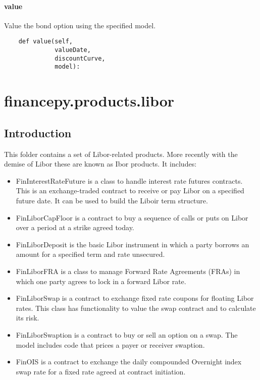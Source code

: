 \documentclass[twoside,11pt]{book}
\begin{document}
\subsubsection*{{\bf value}}
Value the bond option using the specified model.  

\begin{lstlisting}
    def value(self,
              valueDate,
              discountCurve,
              model):
\end{lstlisting}


\chapter{financepy.products.libor}
\section{Introduction}

This folder contains a set of Libor-related products. More recently with the demise of Libor these are known as Ibor products. It includes:

\begin{itemize}
\item{ FinInterestRateFuture is a class to handle interest rate futures contracts. This is an exchange-traded contract to receive or pay Libor on a specified future date. It can be used to build the Liboir term structure. 
}
\item{ FinLiborCapFloor is a contract to buy a sequence of calls or puts on Libor over a period at a strike agreed today.
}
\item{ FinLiborDeposit is the basic Libor instrument in which a party borrows an amount for a specified term and rate unsecured.
}
\item{ FinLiborFRA is a class to manage Forward Rate Agreements (FRAs) in which one party agrees to lock in a forward Libor rate.
}
\item{ FinLiborSwap is a contract to exchange fixed rate coupons for floating Libor rates. This class has functionality to value the swap contract and to calculate its risk.
}
\item{ FinLiborSwaption is a contract to buy or sell an option on a swap. The model includes code that prices a payer or receiver swaption.
}
\item{ FinOIS is a contract to exchange the daily compounded Overnight index swap rate for a fixed rate agreed at contract initiation.
}
\end{itemize}
\newpage
\end{document}
